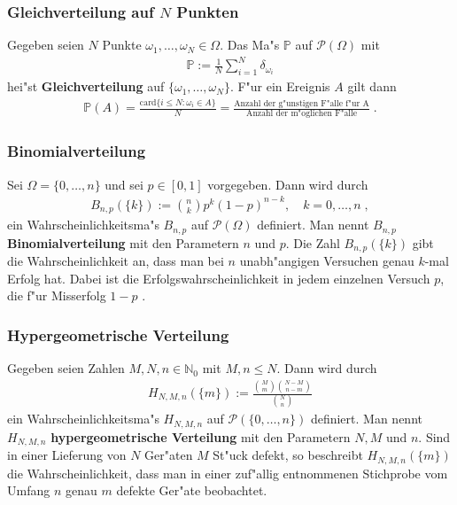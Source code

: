 \documentclass[ngerman,draft,parskip=half,twoside]{scrartcl}
\newcommand*{\N}{\mathbb{N}}      %
\newcommand*{\PotM}{\mathcal{P}}    %
\newcommand*{\WKM}{\mathbb{P}}      %
\begin{document}
\subsubsection{Gleichverteilung auf $N$ Punkten}
Gegeben seien $N$ Punkte $\omega_1,\ldots,\omega_N\in\Omega$.
Das Ma"s $\WKM$ auf $\PotM(\Omega)$ mit
\begin{gather*}
  \WKM:=\frac{1}{N}\sum_{i=1}^N \delta_{\omega_i}
\end{gather*}
hei"st \textbf{Gleichverteilung} auf $\{\omega_1,\ldots,\omega_N\}$. F"ur ein Ereignis $A$ gilt dann
\begin{gather*}
  \WKM(A)=\frac{\mathrm{card}\{ i\le N : \omega_i\in A\}}{N}=
     \frac{\mbox{Anzahl der g"unstigen F"alle f"ur A}}{\mbox{Anzahl der m"oglichen F"alle}}\;.
\end{gather*}
\subsubsection{Binomialverteilung}
Sei $\Omega=\{0,\ldots,n\}$ und sei $p\in[0,1]$ vorgegeben. Dann wird durch
\begin{gather*}
  B_{n,p}(\{k\}):={n\choose k} p^k(1-p)^{n-k},\quad k=0,\ldots,n\;,
\end{gather*}
ein Wahrscheinlichkeitsma"s $B_{n,p}$ auf $\PotM(\Omega)$ definiert. Man nennt $B_{n,p}$
\textbf{Binomialverteilung} mit den Parametern $n$ und $p$. Die Zahl
$B_{n,p}(\{k\})$ gibt die Wahrscheinlichkeit an, dass man bei $n$ unabh"angigen Versuchen genau $k$-mal
Erfolg hat. Dabei ist die Erfolgswahrscheinlichkeit in jedem einzelnen Versuch $p$, die f"ur
Misserfolg $1-p$ .
\subsubsection{Hypergeometrische Verteilung}
Gegeben seien Zahlen $M,N,n\in\N_0$ mit $M,n\le N$. Dann wird durch
\begin{gather*}
  H_{N, M ,n}(\{m\}) :=\frac{{M\choose m}{N-M\choose n-m}}{{N\choose n}}
\end{gather*}
ein Wahrscheinlichkeitsma"s $H_{N,M,n}$ auf $\PotM(\{0,\ldots,n\})$
definiert. Man nennt $H_{N,M,n}$  \textbf{hypergeometrische Verteilung} mit den Parametern $N,M$ und $n$.
Sind in einer Lieferung von $N$ Ger"aten $M$ St"uck defekt, so beschreibt $H_{N,M,n}(\{m\})$
die Wahrscheinlichkeit, dass man in einer zuf"allig entnommenen Stichprobe vom Umfang $n$ genau
$m$ defekte Ger"ate beobachtet.
\end{document}
